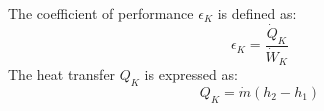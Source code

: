 The coefficient of performance \( \epsilon_K \) is defined as:  
\[
\epsilon_K = \frac{\dot{Q}_K}{\dot{W}_K}
\]  
The heat transfer \( Q_K \) is expressed as:  
\[
Q_K = \dot{m} (h_2 - h_1)
\]